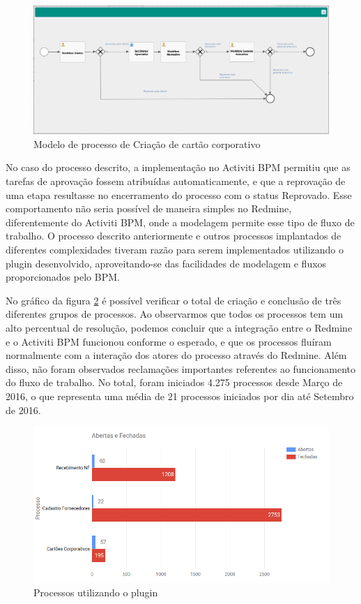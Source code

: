 \begin{figure}[H]
\centering
\includegraphics[width=1\textwidth]{imagens/processo_cartao_compras.png}
\caption{Modelo de processo de Criação de cartão corporativo}
\label{fig:process_cartao_compras}
\end{figure}


No caso do processo descrito, a implementação no Activiti BPM permitiu que as tarefas de aprovação fossem atribuídas automaticamente, e que a reprovação de uma etapa resultasse no encerramento do processo com o status Reprovado. Esse comportamento não seria possível de maneira simples no Redmine, diferentemente do Activiti BPM, onde a modelagem permite esse tipo de fluxo de trabalho. O processo descrito anteriormente e outros processos implantados de diferentes complexidades tiveram razão para serem implementados utilizando o plugin desenvolvido, aproveitando-se das facilidades de modelagem e fluxos proporcionados pelo BPM.

No gráfico da figura \ref{fig:grafico_processo} é possível verificar o total de criação e conclusão de três diferentes grupos de processos. Ao observarmos que todos os processos tem um alto percentual de resolução, podemos concluir que a integração entre o Redmine e o Activiti BPM funcionou conforme o esperado, e que os processos fluíram normalmente com a interação dos atores do processo através do Redmine. Além disso, não foram observados reclamações importantes referentes ao funcionamento do fluxo de trabalho. No total, foram iniciados 4.275 processos desde Março de 2016, o que representa uma média de 21 processos iniciados por dia até Setembro de 2016.

\begin{figure}[H]
\centering
\includegraphics[width=1\textwidth]{imagens/grafico_processo.png}
\caption{Processos utilizando o plugin}
\label{fig:grafico_processo}
\end{figure}


